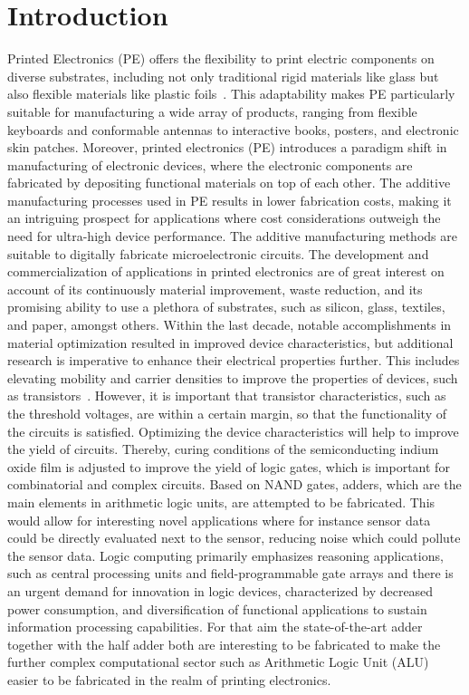 \chapter{Introduction}
\label{introduction}
Printed Electronics (PE) offers the flexibility to print electric components on diverse substrates, including not only traditional rigid materials like glass but also flexible materials like plastic foils~\cite{motivation1}. This adaptability makes PE particularly suitable for manufacturing a wide array of products, ranging from flexible keyboards and conformable antennas to interactive books, posters, and electronic skin patches.
Moreover, printed electronics (PE) introduces a paradigm shift in manufacturing of electronic devices, where the electronic components are fabricated by depositing functional materials on top of each other. The additive manufacturing processes used in PE results in lower fabrication costs, making it an intriguing prospect for applications where cost considerations outweigh the need for ultra-high device performance. The additive manufacturing methods are suitable to digitally fabricate microelectronic circuits. The development and commercialization of applications in printed electronics are of great interest on account of its continuously material improvement, waste reduction, and its promising ability to use a plethora of substrates, such as silicon, glass, textiles, and paper, amongst others.
Within the last decade, notable accomplishments in material optimization resulted in improved device characteristics, but additional research is imperative to enhance their electrical properties further. This includes elevating mobility and carrier densities to improve the properties of devices, such as transistors~\cite{motivation2}. However, it is important that transistor characteristics, such as the threshold voltages, are within a certain margin, so that the functionality of the circuits is satisfied. 
Optimizing the device characteristics will help to improve the yield of circuits. Thereby, curing conditions of the semiconducting indium oxide film is adjusted to improve the yield of logic gates, which is important for combinatorial and complex circuits. Based on NAND gates, adders, which are the main elements in arithmetic logic units, are attempted to be fabricated. This would allow for interesting novel applications where for instance sensor data could be directly evaluated next to the sensor, reducing noise which could pollute the sensor data.
Logic computing primarily emphasizes reasoning applications, such as central processing units and field-programmable gate arrays and there is an urgent demand for innovation in logic devices, characterized by decreased power consumption, and diversification of functional applications to sustain information processing capabilities. For that aim the state-of-the-art adder together with the half adder both are interesting to be fabricated to make the further complex computational sector such as Arithmetic Logic Unit (ALU) easier to be fabricated in the realm of printing electronics. 
